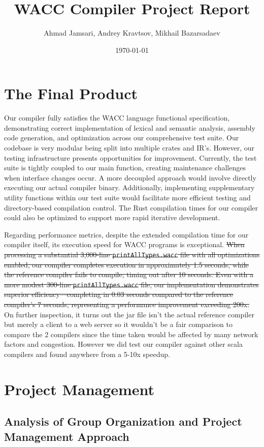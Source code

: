 \documentclass[11pt,a4paper]{article}
\title{WACC Compiler Project Report}
\author{Ahmad Jamsari, Andrey Kravtsov, Mikhail Bazarsadaev}
\date{\today}
\begin{document}
\maketitle

\section{The Final Product}

Our compiler fully satisfies the WACC language functional specification, demonstrating correct implementation of lexical and semantic analysis, assembly code generation, and optimization across our comprehensive test suite. Our codebase is very modular being split into multiple crates and IR's.
However, our testing infrastructure presents opportunities for improvement. Currently, the test suite is tightly coupled to our main function, creating maintenance challenges when interface changes occur. A more decoupled approach would involve directly executing our actual compiler binary. Additionally, implementing supplementary utility functions within our test suite would facilitate more efficient testing and directory-based compilation control. The Rust compilation times for our compiler could also be optimized to support more rapid iterative development.

Regarding performance metrics, despite the extended compilation time for our compiler itself, its execution speed for WACC programs is exceptional. \st{When processing a substantial 3,000-line \texttt{printAllTypes.wacc} file with all optimizations enabled, our compiler completes execution in approximately 1.5 seconds, while the reference compiler fails to compile, timing out after 10 seconds. Even with a more modest 300-line \texttt{printAllTypes.wacc} file, our implementation demonstrates superior efficiency—completing in 0.03 seconds compared to the reference compiler's 7 seconds, representing a performance improvement exceeding 200x.} On further inspection, it turns out the jar file isn't the actual reference compiler but merely a client to a web server so it wouldn't be a fair comparison to compare the 2 compilers since the time taken would be affected by many network factors and congestion. However we did test our compiler against other scala compilers and found anywhere from a 5-10x speedup.

\section{Project Management}
\subsection{Analysis of Group Organization and Project Management Approach}
\end{document}
